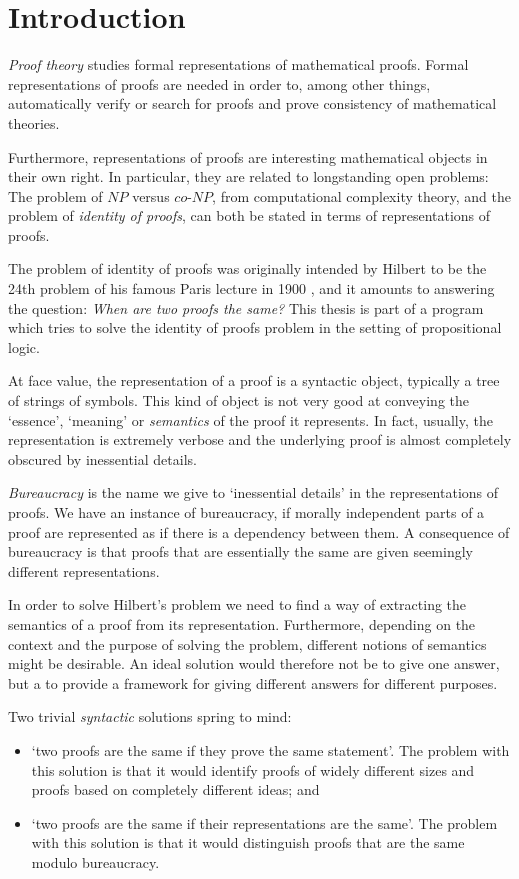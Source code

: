 \chapter{Introduction}

\emph{Proof theory} studies formal representations of mathematical proofs. Formal representations of proofs are needed in order to, among other things, automatically verify or search for proofs and prove consistency of mathematical theories.

Furthermore, representations of proofs are interesting mathematical objects in their own right. In particular, they are related to longstanding open problems: The problem of $NP$ versus $co$-$NP$, from computational complexity theory, and the problem of \emph{identity of proofs}, can both be stated in terms of representations of proofs.

The problem of identity of proofs was originally intended by Hilbert to be the 24th problem of his famous Paris lecture in 1900 \cite{Thie:03:Hilberts:yu}, and it amounts to answering the question: \emph{When are two proofs the same?} This thesis is part of a program which tries to solve the identity of proofs problem in the setting of propositional logic.

At face value, the representation of a proof is a syntactic object, typically a tree of strings of symbols. This kind of object is not very good at conveying the `essence', `meaning' or \emph{semantics} of the proof it represents. In fact, usually, the representation is extremely verbose and the underlying proof is almost completely obscured by inessential details.

\emph{Bureaucracy} is the name we give to `inessential details' in the representations of proofs. We have an instance of  bureaucracy, if morally independent parts of a proof are represented as if there is a dependency between them. A consequence of bureaucracy is that proofs that are essentially the same are given seemingly different representations.

In order to solve Hilbert's problem we need to find a way of extracting the semantics of a proof from its representation. Furthermore, depending on the context and the purpose of solving the problem, different notions of semantics might be desirable. An ideal solution would therefore not be to give one answer, but a to provide a framework for giving different answers for different purposes.

Two trivial \emph{syntactic} solutions spring to mind:
\begin{itemize}
 \item `two proofs are the same if they prove the same statement'. The problem with this solution is that it would identify proofs of widely different sizes and proofs based on completely different ideas; and
 \item `two proofs are the same if their representations are the same'. The problem with this solution is that it would distinguish proofs that are the same modulo bureaucracy.
\end{itemize}

